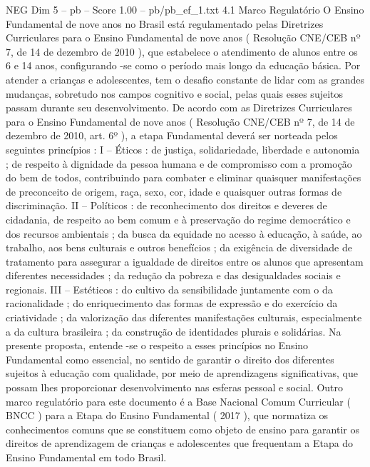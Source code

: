 \begin{textsample}{NEG Dim 5 – pb – Score 1.00 – pb/pb\_ef\_1.txt}  \label{ex:f5_neg_196}
4.1 Marco Regulatório O Ensino Fundamental de nove anos no Brasil está regulamentado pelas Diretrizes Curriculares para o Ensino Fundamental de nove anos ( Resolução CNE/CEB nº 7, de 14 de dezembro de 2010 ), que estabelece o atendimento de alunos entre os 6 e 14 anos, configurando -se como o período mais longo da educação básica.
Por atender a crianças e adolescentes, tem o desafio constante de lidar com as grandes mudanças, sobretudo nos campos cognitivo e social, pelas quais esses sujeitos passam durante seu desenvolvimento.
De acordo com as Diretrizes Curriculares para o Ensino Fundamental de nove anos ( Resolução CNE/CEB nº 7, de 14 de dezembro de 2010, art. 6º ), a etapa Fundamental deverá ser norteada pelos seguintes princípios : I – Éticos : de justiça, solidariedade, liberdade e autonomia ; de respeito à dignidade da pessoa humana e de compromisso com a promoção do bem de todos, contribuindo para combater e eliminar quaisquer manifestações de preconceito de origem, raça, sexo, cor, idade e quaisquer outras formas de discriminação.
II – Políticos : de reconhecimento dos direitos e deveres de cidadania, de respeito ao bem comum e à preservação do regime democrático e dos recursos ambientais ; da busca da equidade no acesso à educação, à saúde, ao trabalho, aos bens culturais e outros benefícios ; da exigência de diversidade de tratamento para assegurar a igualdade de direitos entre os alunos que apresentam diferentes necessidades ; da redução da pobreza e das desigualdades sociais e regionais.
III – Estéticos : do cultivo da sensibilidade juntamente com o da racionalidade ; do enriquecimento das formas de expressão e do exercício da criatividade ; da valorização das diferentes manifestações culturais, especialmente a da cultura brasileira ; da construção de identidades plurais e solidárias.
Na presente proposta, entende -se o respeito a esses princípios no Ensino Fundamental como essencial, no sentido de garantir o direito dos diferentes sujeitos à educação com qualidade, por meio de aprendizagens significativas, que possam lhes proporcionar desenvolvimento nas esferas pessoal e social.
Outro marco regulatório para este documento é a Base Nacional Comum Curricular ( BNCC ) para a Etapa do Ensino Fundamental ( 2017 ), que normatiza os conhecimentos comuns que se constituem como objeto de ensino para garantir os direitos de aprendizagem de crianças e adolescentes que frequentam a Etapa do Ensino Fundamental em todo Brasil.

\end{textsample}
